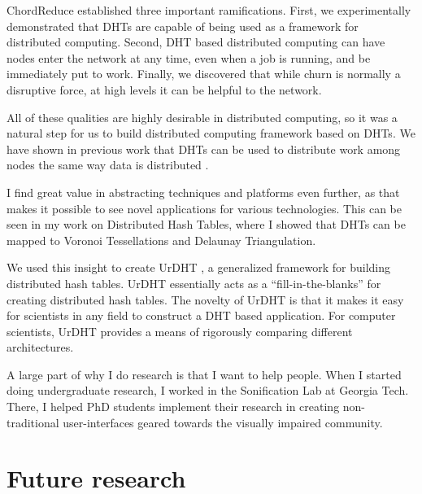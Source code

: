 \documentclass[10pt, a4paper]{article}
\begin{document}
ChordReduce established three important ramifications.
First, we experimentally demonstrated that DHTs are capable of being used as a framework for distributed computing.
Second, DHT based distributed computing can have nodes enter the network at any time, even when a job is running, and be immediately put to work.
Finally, we discovered that while churn is normally a disruptive force, at high levels it can be helpful to the network.

All of these qualities are highly desirable in distributed computing, so it was a natural step for us to build distributed computing framework based on DHTs.
We have shown in previous work that DHTs can be used to distribute work among nodes the same way data is distributed \cite{chordreduce}.



I find great value in abstracting techniques and platforms even further, as that makes it possible to see novel applications for various technologies.  
This can be seen in my work on Distributed Hash Tables, where I showed that DHTs can be mapped to Voronoi Tessellations and Delaunay Triangulation.


We used this insight to create UrDHT \cite{urdht}, a generalized framework for building distributed hash tables.
UrDHT essentially acts as a ``fill-in-the-blanks'' for creating  distributed hash tables.
The novelty of UrDHT is that it makes it easy for scientists in any field to construct a DHT based application.
For computer scientists, UrDHT provides a means of rigorously comparing different architectures.


A large part of why I do research is that I want to help people.
When I started doing undergraduate research, I worked in the Sonification Lab at Georgia Tech.
There, I helped PhD students implement their research in creating  non-traditional user-interfaces geared towards the visually impaired community.



\section{Future research}
\end{document}
